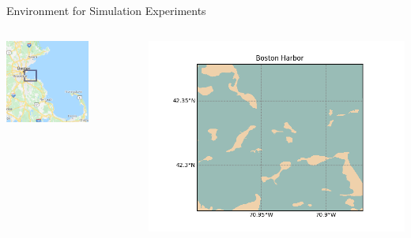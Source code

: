 \documentclass[9pt,xcolor=table]{beamer}
\begin{document}
\begin{frame}{Environment for Simulation Experiments}
    \begin{columns}
        \begin{column}{0.5\textwidth}
        \centering
            \includegraphics[width=0.65\textwidth,trim={0cm 0cm 0cm 0cm},clip]{img/large.png}
        \end{column}    
        \begin{column}{0.5\textwidth}
            \includegraphics[width=\textwidth,trim={0cm 0cm 0cm 0cm},clip]{img/full.png}
        \end{column}
    \end{columns}
    \begin{columns}
        \begin{column}{0.5\textwidth}

\end{column}
\end{columns}
\end{frame}
\end{document}

